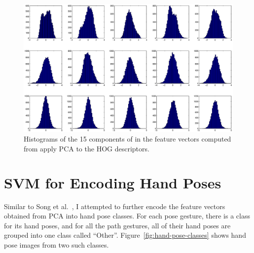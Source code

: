 \begin{figure}[tbh]
\includegraphics[width=\columnwidth]{figures/hist_pca.eps}
\caption{Histograms of the 15 components of in the feature vectors computed
from apply PCA to the HOG descriptors.}
\label{fig:pca}
\end{figure}

\section{SVM for Encoding Hand Poses}
Similar to Song et al.~\cite{song12}, I attempted to further encode the feature
vectors obtained from PCA into hand pose classes. For each pose
gesture, there is a class for its hand poses, and for all the path
gestures, all of their hand poses are grouped into one class called ``Other''.
Figure~\ref{fig:hand-pose-classes} shows hand pose images from two such classes.

